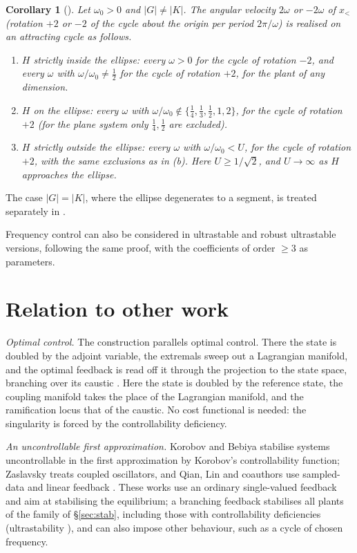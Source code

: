 \documentclass[11pt,reqno]{amsart}
\theoremstyle{plain}
\newtheorem*{corollary}{Corollary}
\theoremstyle{remark}
\theoremstyle{definition}
\begin{document}
\begin{corollary}[{\cite[\S5.5]{Companion}}]
Let $\omega_0>0$ and $|G|\ne|K|$. The angular velocity $2\omega$ or $-2\omega$ of $x_<$ (rotation $+2$ or $-2$ of the cycle about the origin per period $2\pi/\omega$)
is realised on an attracting cycle as follows.
\begin{enumerate}
\item[(a)] $H$ strictly inside the ellipse: every $\omega>0$ for the cycle of rotation $-2$, and every $\omega$ with
  $\omega/\omega_0\ne\frac12$ for the cycle of rotation $+2$, for the plant of any dimension.
\item[(b)] $H$ on the ellipse: every $\omega$ with $\omega/\omega_0\notin\{\frac14,\frac13,\frac12,1,2\}$, for the cycle of rotation $+2$
  \textup{(}for the plane system only $\frac14,\frac12$ are excluded\textup{)}.
\item[(c)] $H$ strictly outside the ellipse: every $\omega$ with $\omega/\omega_0<U$, for the cycle of rotation $+2$, with the same
  exclusions as in \textup{(b)}. Here $U\ge1/\sqrt2$, and $U\to\infty$ as $H$ approaches the ellipse.
\end{enumerate}
\end{corollary}

The case $|G|=|K|$, where the ellipse degenerates to a segment, is treated separately in \cite[\S5.2]{Companion}.

Frequency control can also be considered in ultrastable and robust ultrastable versions, following the same proof, with the coefficients of order ${\ge}3$ as parameters.

\section{Relation to other work}\label{sec:relation}

\emph{Optimal control.} The construction parallels optimal control. There the state is doubled by the adjoint
variable, the extremals sweep out a Lagrangian manifold, and the optimal feedback is read off it through the
projection to the state space, branching over its caustic \cite{AGV}. Here the state is doubled by the reference
state, the coupling manifold takes the place of the Lagrangian manifold, and the ramification locus that of the
caustic. No cost functional is needed: the singularity is forced by the controllability deficiency.

\emph{An uncontrollable first approximation.} Korobov and Bebiya \cite{KorobovBebiya2017} stabilise systems
uncontrollable in the first approximation by Korobov's controllability function; Zaslavsky
\cite{Zaslavsky1996} treats coupled oscillators, and Qian, Lin and coauthors use sampled-data and linear feedback
\cite{QianDuLi2016,YuLin2024}. These works use an ordinary single-valued feedback and aim at stabilising the
equilibrium; a branching feedback stabilises all plants of the family of \S\ref{sec:stab}, including those with controllability deficiencies (ultrastability \cite{Companion}), and can also
impose other behaviour, such as a cycle of chosen frequency.
\end{document}
